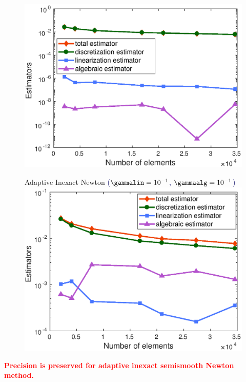 \begin{frame}
\begin{figure}
\begin{minipage}[c]{.333\linewidth}
\includegraphics[width=\textwidth]{fig_article_chap_1/inexact_resolution_convergence_estimator_number_elements.eps}    
\end{minipage}\hfill
\begin{minipage}[c]{.33\linewidth}
   \centering
   \small{\small{Adaptive Inexact Newton} \hspace{3 cm} \scriptsize{\textcolor{midnightblue}{($\gammalin=10^{-1}$, $\gammaalg=10^{-1}$)}}}
\includegraphics[width=\textwidth]{fig_article_chap_1/adapt_inexact_resolution_convergence_estimator_number_elements.eps}     
\end{minipage}
\end{figure}

\textcolor{red}{\textbf{Precision is preserved for adaptive inexact semismooth Newton method.}}


\end{frame}

